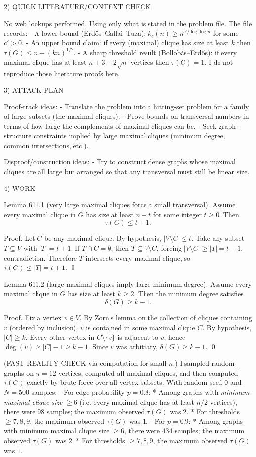 2) QUICK LITERATURE/CONTEXT CHECK

No web lookups performed. Using only what is stated in the problem file.
The file records:
- A lower bound (Erd\H{o}s--Gallai--Tuza): $k_c(n)\ge n^{c'/\log\log n}$ for some $c'>0$.
- An upper bound claim: if every (maximal) clique has size at least $k$ then $\tau(G)\le n-(kn)^{1/2}$.
- A sharp threshold result (Bollob\'{a}s--Erd\H{o}s): if every maximal clique has at least $n+3-2\sqrt n$ vertices then $\tau(G)=1$.
I do not reproduce those literature proofs here.

3) ATTACK PLAN

Proof-track ideas:
- Translate the problem into a hitting-set problem for a family of large subsets (the maximal cliques).
- Prove bounds on transversal numbers in terms of how large the complements of maximal cliques can be.
- Seek graph-structure constraints implied by large maximal cliques (minimum degree, common intersections, etc.).

Disproof/construction ideas:
- Try to construct dense graphs whose maximal cliques are all large but arranged so that any transversal must still be linear size.

4) WORK

Lemma 611.1 (very large maximal cliques force a small transversal).
Assume every maximal clique in $G$ has size at least $n-t$ for some integer $t\ge 0$.
Then
\[
\tau(G)\le t+1.
\]

Proof.
Let $C$ be any maximal clique. By hypothesis, $|V\setminus C|\le t$.
Take any subset $T\subseteq V$ with $|T|=t+1$.
If $T\cap C=\emptyset$, then $T\subseteq V\setminus C$, forcing $|V\setminus C|\ge |T|=t+1$, contradiction.
Therefore $T$ intersects every maximal clique, so $\tau(G)\le |T|=t+1$.
\qed

Lemma 611.2 (large maximal cliques imply large minimum degree).
Assume every maximal clique in $G$ has size at least $k\ge 2$.
Then the minimum degree satisfies
\[
\delta(G)\ge k-1.
\]

Proof.
Fix a vertex $v\in V$.
By Zorn's lemma on the collection of cliques containing $v$ (ordered by inclusion), $v$ is contained in some maximal clique $C$.
By hypothesis, $|C|\ge k$.
Every other vertex in $C\setminus\{v\}$ is adjacent to $v$, hence $\deg(v)\ge |C|-1\ge k-1$.
Since $v$ was arbitrary, $\delta(G)\ge k-1$.
\qed

(FAST REALITY CHECK via computation for small $n$.)
I sampled random graphs on $n=12$ vertices, computed all maximal cliques, and then computed $\tau(G)$ exactly by brute force over all vertex subsets.
With random seed $0$ and $N=500$ samples:
- For edge probability $p=0.8$:
  * Among graphs with \emph{minimum maximal clique size} $\ge 6$ (i.e. every maximal clique has at least $n/2$ vertices), there were $98$ samples; the maximum observed $\tau(G)$ was $2$.
  * For thresholds $\ge 7,8,9$, the maximum observed $\tau(G)$ was $1$.
- For $p=0.9$:
  * Among graphs with minimum maximal clique size $\ge 6$, there were $434$ samples; the maximum observed $\tau(G)$ was $2$.
  * For thresholds $\ge 7,8,9$, the maximum observed $\tau(G)$ was $1$.

